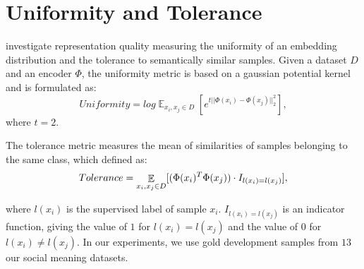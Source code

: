 \section{Uniformity and Tolerance}\label{sec:uni-tole}
\citet{wang-2021-understanding} investigate representation quality measuring the uniformity of an embedding distribution and the tolerance to semantically similar samples. Given a dataset $D$ and an encoder $\Phi$, the uniformity metric is based on a gaussian potential kernel and is formulated as:
\begin{equation}
    Uniformity = log \mathop{\mathbb{E}}_{x_i, x_j\in D}[ e^{ t ||\Phi(x_i) - \Phi(x_j)||^2_2 } ], 
\end{equation}
where $t=2$.

The tolerance metric measures the mean of similarities of samples belonging to the same class, which defined as:
\begin{equation}
\small
    Tolerance = \mathop{\mathbb{E}}_{x_i, x_j\in D}[(\Phi(x_i)^T\Phi(x_j)) \cdot I_{l(x_i)=l(x_j)}],
\end{equation}

where $l(x_i)$ is the supervised label of sample $x_i$. $I_{l(x_i)=l(x_j)}$ is an indicator function, giving the value of $1$ for $l(x_i)=l(x_j)$ and the value of $0$ for $l(x_i)\neq l(x_j)$. In our experiments, we use gold development samples from $13$ our social meaning datasets. 
